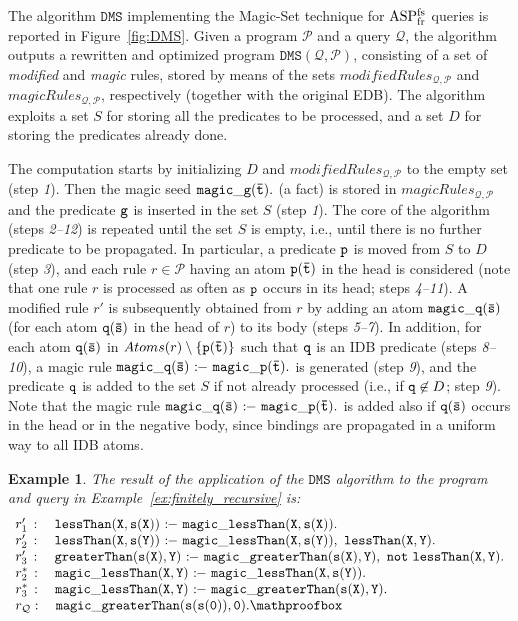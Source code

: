 \documentclass{tlp}
\newcommand{\derives}{\ensuremath{\mathtt{\ :\!\!-}\ }}
\newcommand{\p}{\ensuremath{{\mathcal{P}}}}
\newcommand{\R}{\ensuremath{r}}
\newcommand{\naf}{\ensuremath{\mathtt{not}}\xspace}
\newcommand{\atoms}[1]{\ensuremath{Atoms(#1)}}
\newenvironment{dlvcode}
  {\begin{displaymath}\begin{array}{l}}
  {\end{array}\end{displaymath}}
\newtheorem{example}[theorem]{Example}
\renewcommand{\P}{\mathcal{P}}
\newcommand{\Q}{\mathcal{Q}}
\newcommand{\magicRules}{\ensuremath{\mathit{magicRules}}}
\newcommand{\modifiedRules}{$\mathit{modifiedRules}$}
\newcommand{\magica}{*}
\newcommand{\DMS}{\ensuremath{\mathtt{DMS}}}
\renewcommand{\t}{\bar t}
\newcommand{\s}{\bar s}
\newcommand{\ASPFNFR}{\ensuremath{\rm ASP^{\rm fs}_{\rm fr}}}
\begin{document}
The algorithm $\DMS$ implementing the Magic-Set technique for \ASPFNFR{}
queries is reported in Figure~\ref{fig:DMS}.
Given a program $\p$ and a query $\Q$, the algorithm outputs a rewritten and
optimized program $\DMS(\Q,\p)$, consisting of a set of
\emph{modified} and \emph{magic} rules, stored by means of the sets 
\modifiedRules$_{\Q,\P}$ and \magicRules$_{\Q,\P}$, respectively
(together with the original EDB). 
The algorithm exploits a set $S$ for storing all the predicates to
be processed, and a set $D$ for storing the predicates already done. 

The computation starts by initializing $D$ and \modifiedRules$_{\Q,\P}$ to the empty set
(step \emph{1}). Then the
magic seed $\tt magic\_g(\t).$ (a fact) is stored in \magicRules$_{\Q,\P}$ and
the predicate $\tt g$ is inserted in the set $S$ (step \emph{1}). 
The core of the algorithm (steps \emph{2--12}) is repeated until the set $S$ is empty, i.e., until there is no
further predicate to be propagated. In particular, a predicate $\tt p$ is moved from
$S$ to $D$ (step \emph{3}), and each rule $\R \in \P$ 
having an atom $\tt p(\t)$ in the head is considered (note that one rule $\R$ is
processed as often as $\tt p$ occurs in its head; steps \emph{4--11}).
A modified rule $\R'$ is subsequently obtained from $\R$ by adding 
an atom $\tt magic\_q(\s)$ (for each atom $\tt q(\s)$ in the head of $\R$)
to its body (steps \emph{5--7}).
In addition, for each atom $\tt q(\s)$ in $\atoms{\R} \setminus \{{\tt p(\t)}\}$
such that $\tt q$ is an IDB predicate (steps \emph{8--10}), a magic rule 
$\tt magic\_q(\s) \derives magic\_p(\t).$ is generated (step \emph{9}), and the predicate
$\tt q$ is added to the set $S$ if not already processed (i.e., if ${\tt q} \not\in D$; step \emph{9}).
Note that the magic rule $\tt magic\_q(\s) \derives magic\_p(\t).$ is added
also if $\tt q(\s)$ occurs in the head or in the negative body,
since bindings are propagated in a uniform way to all IDB atoms.


\begin{example}
The result of the application of the $\DMS$ algorithm to the program and query 
in Example~\ref{ex:finitely_recursive} is:
\begin{dlvcode}
\R_1'\,:\quad \tt lessThan(X,s(X)) \derives magic\_lessThan(X,s(X)). \\
\R_2'\,:\quad \tt lessThan(X,s(Y)) \derives magic\_lessThan(X,s(Y)),\ lessThan(X,Y). \\
\R_3'\,:\quad \tt greaterThan(s(X),Y) \derives magic\_greaterThan(s(X),Y),\ \naf~lessThan(X,Y). \\
\R_2^\magica\,:\quad \tt magic\_lessThan(X,Y) \derives magic\_lessThan(X,s(Y)). \\
\R_3^\magica\,:\quad \tt magic\_lessThan(X,Y) \derives magic\_greaterThan(s(X),Y).\\
\R_{\Q}:\quad \tt magic\_greaterThan(s(s(0)),0).\mathproofbox
\end{dlvcode}\end{example}
\end{document}
